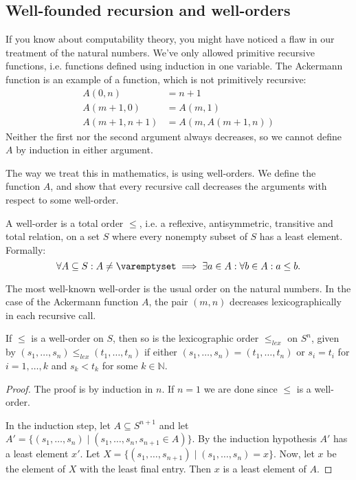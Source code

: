 \documentclass[a4paper, 12pt]{article}
\newcommand{\N}{\mathbb{N}}
\theoremstyle{changedot}
\theoremstyle{changedotbreak}
\theoremstyle{nonumberplain}
\newtheorem{proof}{Proof}
\begin{document}
\subsection{Well-founded recursion and well-orders}
If you know about computability theory, you might have noticed a flaw in our treatment of the natural numbers. We've only allowed primitive recursive functions, i.e. functions defined using induction in one variable. The Ackermann function is an example of a function, which is not primitively recursive:
\begin{align*}
  A(0, n) &= n + 1 \\
  A(m + 1, 0) &= A(m, 1) \\
  A(m + 1, n + 1) &= A(m, A(m + 1, n))
\end{align*}
Neither the first nor the second argument always decreases, so we cannot define $A$ by induction in either argument.

The way we treat this in mathematics, is using well-orders. We define the function $A$, and show that every recursive call decreases the arguments with respect to some well-order.

\begin{definition}
  A well-order is a total order $\leq$, i.e. a reflexive, antisymmetric, transitive and total relation, on a set $S$ where every nonempty subset of $S$ has a least element. Formally:
  \[\forall A \subseteq S : A \neq \varemptyset \implies \exists a \in A: \forall b \in A: a \leq b.\]
\end{definition}

The most well-known well-order is the usual order on the natural numbers. In the case of the Ackermann function $A$, the pair $(m, n)$ decreases lexicographically in each recursive call.

\begin{proposition}
  If $\leq$ is a well-order on $S$, then so is the lexicographic order $\leq_{lex}$ on $S^{n}$, given by $(s_{1}, \dots, s_{n}) \leq_{lex} (t_{1}, \dots, t_{n})$ if either $(s_{1}, \dots, s_{n}) = (t_{1}, \dots, t_{n})$ or $s_{i} = t_{i}$ for $i=1, \dots, k$ and $s_{k} < t_{k}$ for some $k \in \N$.
\end{proposition}
\begin{proof}
  The proof is by induction in $n$. If $n = 1$ we are done since $\leq$ is a well-order.

  In the induction step, let $A \subseteq S^{n+1}$ and let $A' = \{(s_{1}, \dots, s_{n}) \mid (s_{1}, \dots, s_{n}, s_{n+1} \in A)\}$. By the induction hypothesis $A'$ has a least element $x'$. Let $X = \{(s_{1}, \dots, s_{n+1}) \mid (s_{1}, \dots, s_{n}) = x\}$. Now, let $x$ be the element of $X$ with the least final entry. Then $x$ is a least element of $A$.
\end{proof}
\end{document}
